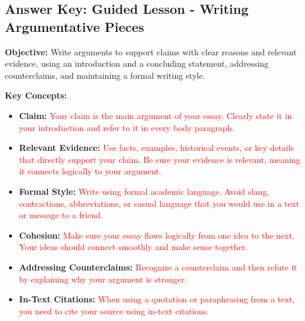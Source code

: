 \documentclass[12pt]{article}
\begin{document}
\subsection*{\textbf{Answer Key: Guided Lesson - Writing Argumentative Pieces}}
\onehalfspacing

\begin{tcolorbox}[colframe=black!40, colback=gray!5, 
coltitle=black, colbacktitle=black!20, fonttitle=\bfseries\Large, 
title=Learning Objective, halign title=center, left=5pt, right=5pt, top=5pt, bottom=15pt]
\textbf{Objective:} Write arguments to support claims with clear reasons and relevant evidence, using an introduction and a concluding statement, addressing counterclaims, and maintaining a formal writing style.
\end{tcolorbox}

\vspace{1em}

\begin{tcolorbox}[colframe=black!60, colback=white, 
coltitle=black, colbacktitle=black!15, fonttitle=\bfseries\Large, 
title=Key Concepts and Vocabulary, halign title=center, left=10pt, right=10pt, top=10pt, bottom=15pt]
\textbf{Key Concepts:}
\begin{itemize}
    \item \textbf{Claim:} \textcolor{red}{Your claim is the main argument of your essay. Clearly state it in your introduction and refer to it in every body paragraph.}
    \item \textbf{Relevant Evidence:} \textcolor{red}{Use facts, examples, historical events, or key details that directly support your claim. Be sure your evidence is relevant, meaning it connects logically to your argument.}
    \item \textbf{Formal Style:} \textcolor{red}{Write using formal academic language. Avoid slang, contractions, abbreviations, or casual language that you would use in a text or message to a friend.}
    \item \textbf{Cohesion:} \textcolor{red}{Make sure your essay flows logically from one idea to the next. Your ideas should connect smoothly and make sense together.}
    \item \textbf{Addressing Counterclaims:} \textcolor{red}{Recognize a counterclaim and then refute it by explaining why your argument is stronger.}
    \item \textbf{In-Text Citations:} \textcolor{red}{When using a quotation or paraphrasing from a text, you need to cite your source using in-text citations.}
\end{itemize}
\end{tcolorbox}
\end{document}
